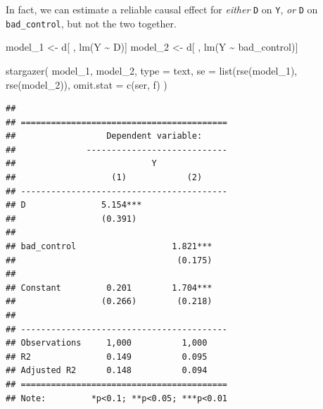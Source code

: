 \documentclass[
]{article}
\newenvironment{Shaded}{\begin{snugshade}}{\end{snugshade}}
\newcommand{\AttributeTok}[1]{\textcolor[rgb]{0.77,0.63,0.00}{#1}}
\newcommand{\FunctionTok}[1]{\textcolor[rgb]{0.00,0.00,0.00}{#1}}
\newcommand{\NormalTok}[1]{#1}
\newcommand{\OtherTok}[1]{\textcolor[rgb]{0.56,0.35,0.01}{#1}}
\newcommand{\SpecialCharTok}[1]{\textcolor[rgb]{0.00,0.00,0.00}{#1}}
\newcommand{\StringTok}[1]{\textcolor[rgb]{0.31,0.60,0.02}{#1}}
\begin{document}
In fact, we can estimate a reliable causal effect for \emph{either} \texttt{D} on \texttt{Y}, \emph{or} \texttt{D} on \texttt{bad\_control}, but not the two together.

\begin{Shaded}
\begin{Highlighting}[]
\NormalTok{model\_1 }\OtherTok{\textless{}{-}}\NormalTok{ d[ , }\FunctionTok{lm}\NormalTok{(Y }\SpecialCharTok{\textasciitilde{}}\NormalTok{ D)]}
\NormalTok{model\_2 }\OtherTok{\textless{}{-}}\NormalTok{ d[ , }\FunctionTok{lm}\NormalTok{(Y }\SpecialCharTok{\textasciitilde{}}\NormalTok{ bad\_control)]}
\end{Highlighting}
\end{Shaded}

\begin{Shaded}
\begin{Highlighting}[]
\FunctionTok{stargazer}\NormalTok{(}
\NormalTok{  model\_1, model\_2, }
  \AttributeTok{type =} \StringTok{\textquotesingle{}text\textquotesingle{}}\NormalTok{, }
  \AttributeTok{se =} \FunctionTok{list}\NormalTok{(}\FunctionTok{rse}\NormalTok{(model\_1), }\FunctionTok{rse}\NormalTok{(model\_2)), }
  \AttributeTok{omit.stat =} \FunctionTok{c}\NormalTok{(}\StringTok{\textquotesingle{}ser\textquotesingle{}}\NormalTok{, }\StringTok{\textquotesingle{}f\textquotesingle{}}\NormalTok{)}
\NormalTok{)}
\end{Highlighting}
\end{Shaded}

\begin{verbatim}
## 
## =========================================
##                  Dependent variable:     
##              ----------------------------
##                           Y              
##                   (1)            (2)     
## -----------------------------------------
## D               5.154***                 
##                 (0.391)                  
##                                          
## bad_control                   1.821***   
##                                (0.175)   
##                                          
## Constant         0.201        1.704***   
##                 (0.266)        (0.218)   
##                                          
## -----------------------------------------
## Observations     1,000          1,000    
## R2               0.149          0.095    
## Adjusted R2      0.148          0.094    
## =========================================
## Note:         *p<0.1; **p<0.05; ***p<0.01
\end{verbatim}
\end{document}
